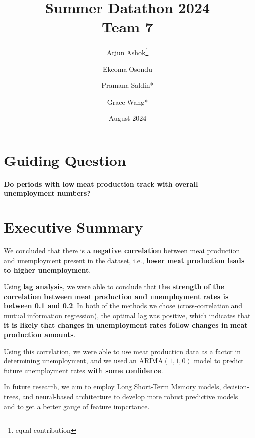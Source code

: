 \documentclass[12pt]{article}
\title{Summer Datathon 2024 \\ \large Team 7}
\author{Arjun Ashok\footnote{equal contribution} \and Ekeoma Osondu \and Pramana Saldin* \and Grace Wang*}
\date{August 2024}
\begin{document}
\maketitle

\section{Guiding Question}
\textbf{Do periods with low meat production track with overall unemployment numbers?}

\section{Executive Summary}
We concluded that there is a \textbf{negative correlation} between meat production and unemployment present in the dataset, i.e., \textbf{lower meat production leads to higher unemployment}.

Using \textbf{lag analysis}, we were able to conclude that \textbf{the strength of the correlation between meat production and unemployment rates is between 0.1 and 0.2}. In both of the methods we chose (cross-correlation and mutual information regression), the optimal lag was positive, which indicates that \textbf{it is likely that changes in unemployment rates follow changes in meat production amounts}.

Using this correlation, we were able to use meat production data as a factor in determining unemployment, and we used an $\mathrm{ARIMA}(1,1,0)$ model to predict future unemployment rates \textbf{with some confidence}. 

In future research, we aim to employ Long Short-Term Memory models, decision-trees, and neural-based architecture to develop more robust predictive models and to get a better gauge of feature importance.
\end{document}

